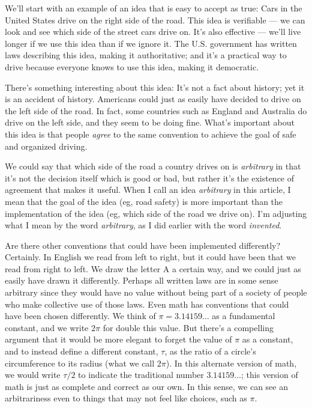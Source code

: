 \documentclass[11pt, oneside]{article}
\theoremstyle{argtstyle}
\begin{document}

We'll start with an example of an
idea that is easy to accept as true:
Cars in the United States drive on the right side of the road.
This idea is verifiable --- we can look and see which side of the street cars
drive on.
It's also effective --- we'll live
longer if we use this idea than if we ignore it.
The U.S.
government has written laws describing this idea, making it authoritative;
and it's a practical
way to drive
because everyone knows to use this idea, making it democratic.

There's something interesting about this idea:
It's not a fact about history; yet it is an accident of history.
Americans could just as
easily have decided to drive on the left side of the road. In fact,
some countries such as England and Australia do drive on the left side, and they
seem to be doing fine. What's important about this idea is that people
{\em agree} to the same convention to achieve the goal of
safe and organized driving.

We could say that which side of the road a country drives on is {\em arbitrary}
in that it's not the decision itself which is good or bad, but rather it's the
existence of agreement that makes it useful.
When I call an idea {\em arbitrary}
in this article, I mean that the goal of the idea (eg, road safety) is more
important than the implementation of the idea (eg, which side of the road we
drive on).
I'm adjusting what I mean by the word {\em arbitrary}, as I did earlier with the
word {\em invented}.

Are there other conventions that could have been implemented differently?
Certainly. In English we read from left to right, but it could have been that we
read from right to left. We draw the letter A a certain way, and we could just
as easily have drawn it differently. Perhaps all written laws are in some sense
arbitrary since they would have no value without being part of a society of
people who make collective use of those laws.
Even math has conventions that could have been chosen differently.
We
think of $\pi=3.14159\ldots$ as a fundamental constant, and we write $2\pi$ for
double this value.
But there's a compelling argument that it would be more elegant to forget the
value of $\pi$ as a constant, and to instead define a different constant,
$\tau$, as the ratio of a circle's circumference to its radius (what we call
$2\pi$). In this alternate version of math, we would write $\tau/2$ to indicate
the traditional number $3.14159\ldots$; this version of math is just as
complete and correct as our own. In this sense, we can see an arbitrariness even
to things that may not feel like choices, such as $\pi$.
\end{document}
